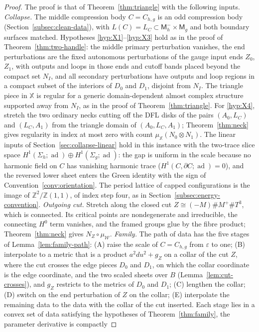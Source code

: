 \documentclass[11pt]{amsart}
\theoremstyle{definition}
\theoremstyle{remark}
\theoremstyle{plain}
\numberwithin{equation}{section}
\newcommand{\ZZ}{\mathbb{Z}}
\newcommand{\ad}{\operatorname{ad}}
\newcommand{\Msf}{\mathsf{M}}
\newcommand{\eps}{\varepsilon}
\begin{document}
\begin{proof}
The proof is that of Theorem~\ref{thm:triangle} with the following inputs.
\emph{Collapse.} The middle compression body $C=C_{h,g}$ is an odd
compression body (Section~\ref{subsec:clean-data}), with $L(C)=L_C\subset
\Msf_h^-\times\Msf_g$ and both boundary surfaces matched. Hypotheses
\ref{hyp:X1}--\ref{hyp:X3} hold as in the proof of Theorem~\ref{thm:two-handle}: the middle
primary perturbation vanishes, the end perturbations are the fixed autonomous perturbations of
the gauge input ends $Z_0$, $Z_1$, with outputs and loops in those ends and cutoff bands placed
beyond the compact set $N_I$, and all secondary perturbations have outputs and loop regions in a
compact subset of the interiors of $D_0$ and $D_1$, disjoint from $N_I$. The triangle piece in $\mathbb X$ is regular for a generic domain-dependent almost
complex structure supported away from $N_I$, as in the proof of
Theorem~\ref{thm:triangle}. For \ref{hyp:X4}, stretch the two ordinary necks cutting off the
DFL disks of the pairs $(A_0,L_C)$ and $(L_C,A_1)$ from the triangle domain of $(A_0,L_C,A_1)$;
Theorem~\ref{thm:neck} gives regularity in index at most zero with count
$\mu_{\mathbb X}(N_0\otimes N_1)$. The linear inputs of Section~\ref{sec:collapse-linear}
hold in this instance with the two-trace slice space
$H^1(\Sigma_h;\ad)\oplus H^1(\Sigma_g;\ad)$: the gap is uniform in the scale
because no harmonic field on $C$ has vanishing harmonic trace
($H^1(C,\partial C;\ad)=0$), and the reversed lower sheet enters the Green identity
with the sign of Convention~\ref{conv:orientation}. The period lattice of capped
configurations is the image of $\ZZ^2/\ZZ(1,1)$, of index step four, as in
Section~\ref{subsec:energy-convention}.
\emph{Outgoing cut.} Stretch along the closed cut $Z\cong(-M)\#M^+\#T^3$, which is
connected. Its critical points are nondegenerate and irreducible, the connecting
$H^0$ term vanishes, and the framed groups glue by the fibre product;
Theorem~\ref{thm:neck} gives $N_Z\circ\mu_{\mathscr W}$.
\emph{Family.} The path of data has the five stages of
Lemma~\ref{lem:family-path}: (A) raise the scale of $C=C_{h,g}$ from $\eps$ to
one; (B) interpolate to a metric that is a product $a^2du^2+g_Z$ on a collar of
the cut $Z$, where the cut crosses the edge pieces $D_0$ and $D_1$, on which the
collar coordinate is the edge coordinate, and the two scaled sheets over $B$
(Lemma~\ref{lem:cut-crosses}), and $g_Z$ restricts to the metrics of $D_0$ and $D_1$; (C) lengthen the
collar; (D) switch on the end perturbation of $Z$ on the collar; (E)
interpolate the remaining data to the data with the collar of the cut inserted. Each stage lies in a convex set of data satisfying the hypotheses of Theorem~\ref{thm:family}, the parameter derivative is compactly

\end{proof}
\end{document}
